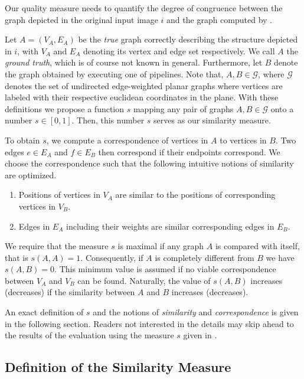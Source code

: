 		Our quality measure needs to quantify the degree of congruence between the graph depicted in the original input image $i$ and the graph computed by \NEFI.  

		Let $A = (V_A, E_A)$ be the \emph{true} graph correctly describing the structure depicted in $i$, with $V_A$ and $E_A$ denoting its vertex and edge set respectively. We call $A$ the \emph{ground truth}, which is of course not known in general. Furthermore, let $B$ denote the graph obtained by executing one of \NEFIs pipelines. Note that, $A, B \in \mathcal{G}$, where $\mathcal{G}$ denotes the set of undirected edge-weighted planar graphs where vertices are labeled with their respective euclidean coordinates in the plane. With these definitions we propose a function $s$ mapping any pair of graphs $A,B \in \mathcal{G}$ onto a number $s \in [0,1]$. Then, this number $s$ serves as our similarity measure. 

		To obtain $s$, we compute a correspondence of vertices in $A$ to vertices in $B$. Two edges $e \in E_A$ and $f \in E_B$ then correspond if their endpoints correspond. We choose the correspondence such that the following intuitive notions of similarity are optimized.

		\begin{enumerate}
		\item Positions of vertices in $V_A$ are similar to the positions of corresponding vertices in $V_B$.  
		\item Edges in $E_A$ including their weights are similar corresponding edges in $E_B$. 
		\end{enumerate}

		We require that the measure $s$ is maximal if any graph $A$ is compared with itself, that is $s(A,A) = 1$. Consequently, if $A$ is completely different from $B$ we have $s(A,B) = 0$. This minimum value is assumed if no viable correspondence between $V_A$ and $V_B$ can be found. Naturally, the value of $s(A,B)$ increases (decreases) if the similarity between $A$ and $B$ increases (decreases).

		An exact definition of $s$ and the notions of \emph{similarity} and \emph{correspondence} is given in the following section. Readers not interested in the details may skip ahead to the results of the evaluation using the measure $s$ given in .

	\subsection{Definition of the Similarity Measure}

